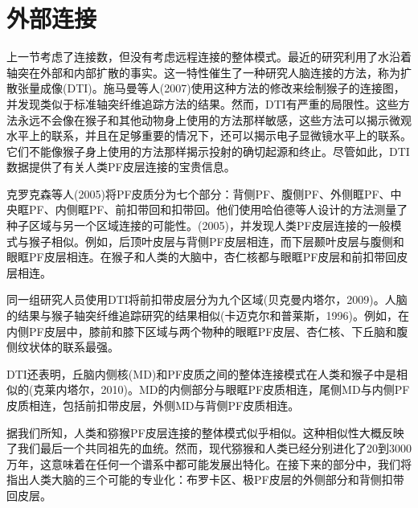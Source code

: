 \section{外部连接}
上一节考虑了连接数，但没有考虑远程连接的整体模式。最近的研究利用了水沿着轴突在外部和内部扩散的事实。这一特性催生了一种研究人脑连接的方法，称为扩散张量成像(DTI)。施马曼等人(2007)使用这种方法的修改来绘制猴子的连接图，并发现类似于标准轴突纤维追踪方法的结果。然而，DTI有严重的局限性。这些方法永远不会像在猴子和其他动物身上使用的方法那样敏感，这些方法可以揭示微观水平上的联系，并且在足够重要的情况下，还可以揭示电子显微镜水平上的联系。它们不能像猴子身上使用的方法那样揭示投射的确切起源和终止。尽管如此，DTI数据提供了有关人类PF皮层连接的宝贵信息。
\par
克罗克森等人(2005)将PF皮质分为七个部分：背侧PF、腹侧PF、外侧眶PF、中央眶PF、内侧眶PF、前扣带回和扣带回。他们使用哈伯德等人设计的方法测量了种子区域与另一个区域连接的可能性。(2005)，并发现人类PF皮层连接的一般模式与猴子相似。例如，后顶叶皮层与背侧PF皮层相连，而下层颞叶皮层与腹侧和眼眶PF皮层相连。在猴子和人类的大脑中，杏仁核都与眼眶PF皮层和前扣带回皮层相连。
\par
同一组研究人员使用DTI将前扣带皮层分为九个区域(贝克曼内塔尔，2009)。人脑的结果与猴子轴突纤维追踪研究的结果相似(卡迈克尔和普莱斯，1996)。例如，在内侧PF皮层中，膝前和膝下区域与两个物种的眼眶PF皮层、杏仁核、下丘脑和腹侧纹状体的联系最强。
\par
DTI还表明，丘脑内侧核(MD)和PF皮质之间的整体连接模式在人类和猴子中是相似的(克莱内塔尔，2010)。MD的内侧部分与眼眶PF皮质相连，尾侧MD与内侧PF皮质相连，包括前扣带皮层，外侧MD与背侧PF皮质相连。
\par
据我们所知，人类和猕猴PF皮层连接的整体模式似乎相似。这种相似性大概反映了我们最后一个共同祖先的血统。然而，现代猕猴和人类已经分别进化了20到3000万年，这意味着在任何一个谱系中都可能发展出特化。在接下来的部分中，我们将指出人类大脑的三个可能的专业化：布罗卡区、极PF皮层的外侧部分和背侧扣带回皮层。

